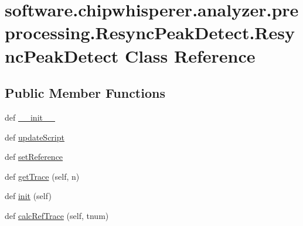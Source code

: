 \hypertarget{classsoftware_1_1chipwhisperer_1_1analyzer_1_1preprocessing_1_1ResyncPeakDetect_1_1ResyncPeakDetect}{}\section{software.\+chipwhisperer.\+analyzer.\+preprocessing.\+Resync\+Peak\+Detect.\+Resync\+Peak\+Detect Class Reference}
\label{classsoftware_1_1chipwhisperer_1_1analyzer_1_1preprocessing_1_1ResyncPeakDetect_1_1ResyncPeakDetect}
\subsection*{Public Member Functions}
\begin{DoxyCompactItemize}
\item 
def \hyperlink{classsoftware_1_1chipwhisperer_1_1analyzer_1_1preprocessing_1_1ResyncPeakDetect_1_1ResyncPeakDetect_a182777d490ddaa61d382ac5eaa330972}{\+\_\+\+\_\+init\+\_\+\+\_\+}
\item 
def \hyperlink{classsoftware_1_1chipwhisperer_1_1analyzer_1_1preprocessing_1_1ResyncPeakDetect_1_1ResyncPeakDetect_aa288ab18a926d8c1184257bd7dda4d80}{update\+Script}
\item 
def \hyperlink{classsoftware_1_1chipwhisperer_1_1analyzer_1_1preprocessing_1_1ResyncPeakDetect_1_1ResyncPeakDetect_a233fa24abccbc0a03aff6a14cab679ff}{set\+Reference}
\item 
def \hyperlink{classsoftware_1_1chipwhisperer_1_1analyzer_1_1preprocessing_1_1ResyncPeakDetect_1_1ResyncPeakDetect_a9e471754a4f2b9cdf151631c7a1fe707}{get\+Trace} (self, n)
\item 
def \hyperlink{classsoftware_1_1chipwhisperer_1_1analyzer_1_1preprocessing_1_1ResyncPeakDetect_1_1ResyncPeakDetect_af3209104dfa456e037f60904a458a343}{init} (self)
\item 
def \hyperlink{classsoftware_1_1chipwhisperer_1_1analyzer_1_1preprocessing_1_1ResyncPeakDetect_1_1ResyncPeakDetect_a66e4696e42346c6eb77c4da4729f2eb8}{calc\+Ref\+Trace} (self, tnum)
\end{DoxyCompactItemize}
